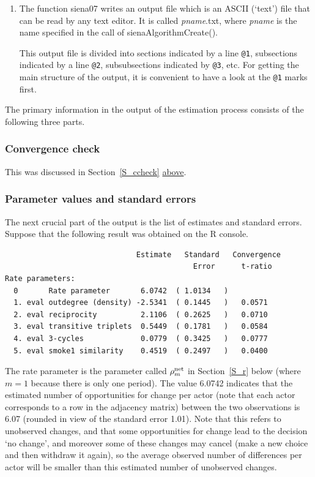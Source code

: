 \documentclass[a4paper,fleqn,11pt]{article}
\newcommand{\+}{\, + \,}
\newcommand{\R}{{\sf R }}
\begin{document}
\begin{enumerate}
  \item The function \textsf{siena07}
        writes an output file which is an ASCII (`text') file that can be
        read by any text editor.
        It is called \textsf{\textsl{pname}.txt},
        where \textsf{\textsl{pname}} is the name
        specified in the call of \textsf{sienaAlgorithmCreate()}.

        This output file is divided into sections
        indicated by a line {\tt @1},
        subsections indicated by a line {\tt @2}, subsubsections indicated
        by {\tt @3}, etc. For getting the main structure of the output, it
        is convenient to have a look at the {\tt @1} marks first.
\end{enumerate}

The primary information in the output of the estimation process
consists of the following three parts.

\subsubsection{Convergence check}

This was discussed in Section~\ref{S_ccheck} \hyperlink{T_convergence}{above}.
\medskip

\subsubsection{Parameter values and standard errors}

The next crucial part of the output is the list of estimates and
standard errors. Suppose that the
following result was obtained on the \R console.

{\footnotesize
\begin{verbatim}
                              Estimate   Standard   Convergence
                                           Error      t-ratio
Rate parameters:
  0       Rate parameter       6.0742  ( 1.0134   )
  1. eval outdegree (density) -2.5341  ( 0.1445   )   0.0571
  2. eval reciprocity          2.1106  ( 0.2625   )   0.0710
  3. eval transitive triplets  0.5449  ( 0.1781   )   0.0584
  4. eval 3-cycles             0.0779  ( 0.3425   )   0.0777
  5. eval smoke1 similarity    0.4519  ( 0.2497   )   0.0400
\end{verbatim}
}

The rate parameter is the parameter called $ \rho^{\rm net}_m$
in Section~\ref{S_r} below (where $m=1$ because there is only one period).
The value 6.0742 indicates
that the estimated number of opportunities
for change per actor (note that each actor
corresponds to a row in the adjacency matrix)
between the two observations is
6.07 (rounded in view of the standard error 1.01). Note that this
refers to unobserved changes, and that some
opportunities for change lead to the decision `no change',
and moreover some of these changes may
cancel (make a new choice and then withdraw it again), so the
average observed number of differences per actor will be
smaller than this estimated number of unobserved changes.
\end{document}
